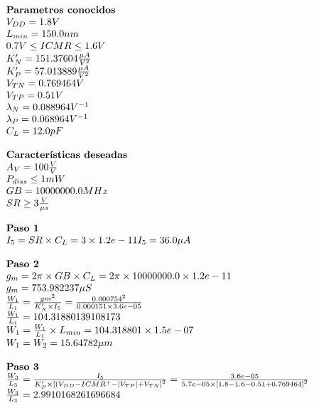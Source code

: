 \begin{equation}
	\begin{array}{l l}
		\textbf{Parametros conocidos} \\
		V_{DD} =  1.8  V \\
		L_{min} =  150.0  nm \\
		0.7 V \leq ICMR \leq 1.6 V \\
		K'_{N} =  151.37604  \frac{\mu A}{V^{2}} \\
		K'_{P} =  57.013889  \frac{\mu A}{V^{2}} \\
		V_{TN} =  0.769464  V \\
		V_{TP} =  0.51  V \\
		\lambda_{N} =  0.088964  V^{-1} \\
		\lambda_{P} =  0.068964  V^{-1} \\
		C_{L} =  12.0  pF \\
		\\
		\textbf{Características deseadas} \\
		A_{V} =  100  \frac{V}{V} \\
		P_{diss} \leq  1  mW \\
		GB =  10000000.0  MHz \\
		SR \geq  3  \frac{V}{\mu s} \\
		\\
		\textbf{Paso 1} \\
		I_{5} = SR \times C_{L} = 3\times1.2e-11
		I_{5} =  36.0 \mu A \\
		\\
		\textbf{Paso 2} \\
		g_{m} = 2\pi{} \times GB \times C_{L} = 2 \pi{} \times10000000.0\times 1.2e-11  \\
		g_{m} =  753.982237  \mu S \\
		\frac{W_1}{L_1} = \frac{gm^2}{K'_{N}\times I_5} = \frac{0.000754^2}{0.000151\times3.6e-05}\\
		\frac{W_1}{L_1} =  104.31880139108173  \\
		W_{1} = \frac{W_1}{L_1} \times L_{min} =  104.318801 \times 1.5e-07  \\
		W_{1} = W_{2} =  15.64782  \mu m \\
		\\
		\textbf{Paso 3} \\
		\frac{W_3}{L_3} = \frac{I_5}{K'_{P}\times \left[(V_{DD}-ICMR^{+}-|V_{TP}|+V_{TN}\right]^{2}} = \frac{ 3.6e-05 }{ 5.7e-05 \times \left[ 1.8 - 1.6 - 0.51 + 0.769464 \right]^{2}} \\
		\frac{W_3}{L_3} =  2.9910168261696684  \\

\end{array}
\end{equation}
